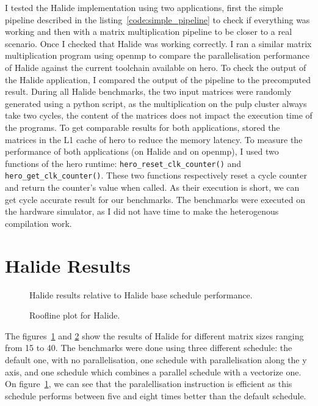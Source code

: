 	I tested the Halide implementation using two applications, first the simple pipeline described in the listing~\ref{code:simple_pipeline} to check if everything was working and then with a matrix multiplication pipeline to be closer to a real scenario. Once I checked that Halide was working correctly.
	I ran a similar matrix multiplication program using \gls{openmp} to compare the parallelisation performance of Halide against the current toolchain available on \gls{hero}.
	To check the output of the Halide application, I compared the output of the pipeline to the precomputed result.
	During  all Halide benchmarks, the two input matrices were randomly generated using a python script, as the multiplication on the \gls{pulp} cluster always take two cycles, the content of the matrices does not impact the execution time of the programs.
	To get comparable results for both applications, stored the matrices in the L1 cache of \gls{hero} to reduce the memory latency.
	To measure the performance of both applications (on Halide and on \gls{openmp}), I used two functions of the \gls{hero} runtime: \texttt{hero\_reset\_clk\_counter()} and \texttt{hero\_get\_clk\_counter()}.
	These two functions respectively reset a cycle counter and return the counter's value when called. As their execution is short, we can get cycle accurate result for our benchmarks.
	The benchmarks were executed on the hardware simulator, as I did not have time to make the heterogenous compilation work.

\section{Halide Results}

\begin{figure}[H]
		\center
		\scalebox{.8}{}
    \caption{Halide results relative to Halide base schedule performance.}
	\label{fig:barPlotHalide}
\end{figure}



\begin{figure}[H]
		\center
	\scalebox{.8}{}
    \caption{Roofline plot for Halide.}
	\label{fig:rooflineHalide}
\end{figure}



	The figures~\ref{fig:barPlotHalide} and \ref{fig:rooflineHalide} show the results of Halide for different matrix sizes ranging from 15 to 40.
	The benchmarks were done using three different schedule: the default one, with no parallelisation, one schedule with parallelisation along the y axis, and one schedule which combines a parallel schedule with a vectorize one.
	On figure~\ref{fig:barPlotHalide}, we can see that the paralellisation instruction is efficient as this schedule performs between five and eight times better than the default schedule.

